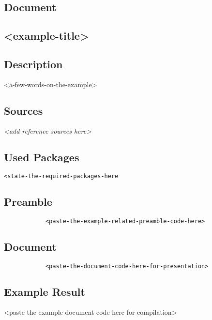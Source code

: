 \documentclass{article}
\begin{document}
	\subsection*{Document}
	\begin{latex}	
			\section*{<example-title>}
			
			\subsection*{Description}
			<a-few-words-on-the-example>
			
			\subsection*{Sources}
			\textit{<add reference sources here>}
			
			\subsection*{Used Packages}
			\verb|<state-the-required-packages-here|
			
			\subsection*{Preamble}
			\begin{lstlisting}
			<paste-the-example-related-preamble-code-here>
			\end{lstlisting}
			
			\subsection*{Document}
			\begin{lstlisting}
			<paste-the-document-code-here-for-presentation>
			\end{lstlisting}
			
			\subsection*{Example Result}
			<paste-the-example-document-code-here-for-compilation>
	\end{latex}
\end{document}
